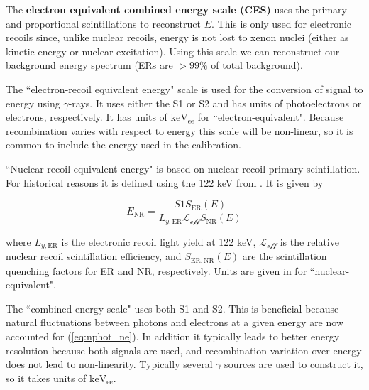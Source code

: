 The \textbf{electron equivalent combined energy scale (CES)} uses the primary and proportional scintillations to reconstruct $E$.  This is
only used for electronic recoils since, unlike nuclear recoils, energy is not lost to xenon nuclei (either as kinetic energy or nuclear
excitation).  Using this scale we can reconstruct our background energy spectrum (ERs are $> 99\%$ of total background).

The ``electron-recoil equivalent energy" scale is used for the conversion of signal to energy using $\gamma$-rays.  It uses either the S1 or
S2 and has units of photoelectrons or electrons, respectively.  It has units of $\mathrm{keV_{ee}}$ for ``electron-equivalent".  Because
recombination varies with respect to energy this scale will be non-linear, so it is common to include the energy used in the
calibration.

``Nuclear-recoil equivalent energy" is based on nuclear recoil primary scintillation.  For historical reasons it is defined using the
122 keV \gammaray from .  It is given by

\begin{equation}
E_{\mathrm{NR}} = \frac{S1 S_{\mathrm{ER}}(E)}{L_{y,\mathrm{ER}} \mathcal{L}_{\mathcal{eff}} S_{\mathrm{NR}}(E)}
\end{equation}

\noindent where $L_{y,\mathrm{ER}}$ is the electronic recoil light yield at 122 keV, $\mathcal{L}_{\mathcal{eff}}$ is the relative nuclear
recoil
scintillation efficiency, and $S_{\mathrm{ER,NR}}(E)$ are the scintillation quenching factors for ER and NR, respectively.  Units are
given in \kevnr for ``nuclear-equivalent".

The ``combined energy scale" uses both S1 and S2.  This is beneficial because natural fluctuations between photons and electrons at a
given energy are now accounted for (\eqref{eq:nphot_ne}).  In addition it typically leads to better energy resolution because both signals
are used, and recombination variation over energy does not lead to non-linearity.  Typically several $\gamma$ sources are used to
construct it, so it takes units of $\mathrm{keV_{ee}}$.






















